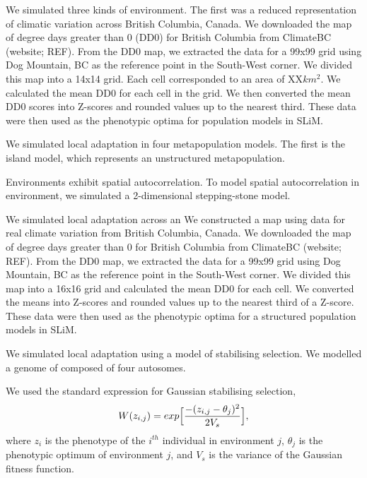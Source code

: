 \documentclass[11pt,twoside,lineno]{GSA_format}
\begin{document}

We simulated three kinds of environment. The first was a reduced representation of climatic variation across British Columbia, Canada. We downloaded the map of degree days greater than 0 (DD0) for British Columbia from ClimateBC (website; REF). From the DD0 map, we extracted the data for a 99x99 grid using Dog Mountain, BC as the reference point in the South-West corner. We divided this map into a 14x14 grid. Each cell corresponded to an area of XX$km^2$. We calculated the mean DD0 for each cell in the grid. We then converted the mean DD0 scores into Z-scores and rounded values up to the nearest third. These data were then used as the phenotypic optima for population models in SLiM.

We simulated local adaptation in four metapopulation models. The first is the island model, which represents an unstructured metapopulation. 

Environments exhibit spatial autocorrelation. To model spatial autocorrelation in environment, we simulated a 2-dimensional stepping-stone model. 

We simulated local adaptation across an 
We constructed a map using data for real climate variation from British Columbia, Canada. We downloaded the map of degree days greater than 0 for British Columbia from ClimateBC (website; REF). From the DD0 map, we extracted the data for a 99x99 grid using Dog Mountain, BC as the reference point in the South-West corner. We divided this map into a 16x16 grid and calculated the mean DD0 for each cell. We converted the means into Z-scores and rounded values up to the nearest third of a Z-score. These data were then used as the phenotypic optima for a structured population models in SLiM.

We simulated local adaptation using a model of stabilising selection. We modelled a genome of composed of four autosomes. 

We used the standard expression for Gaussian stabilising selection,
\begin{equation}
\notag
W(z_{i,j}) = exp \Big[\frac{-(z_{i,j} - \theta_j)^2}{2V_s}\Big],
\end{equation}
where $z_i$ is the phenotype of the $i^{th}$ individual in environment $j$, $\theta_j$ is the phenotypic optimum of environment $j$, and $V_s$ is the variance of the Gaussian fitness function. 
\end{document}
